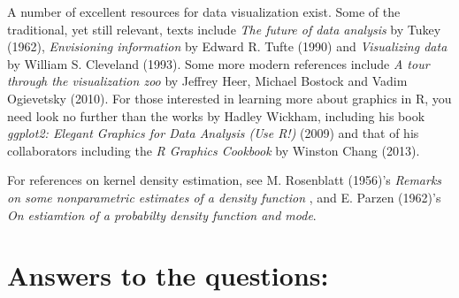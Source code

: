 A number of excellent resources for data visualization exist. Some of the traditional, yet still relevant, texts include \emph{The future of data analysis} by Tukey (1962), \emph{Envisioning information} by Edward R. Tufte (1990) and \emph{Visualizing data} by William S. Cleveland (1993). Some more modern references include \emph{A tour through the visualization zoo} by Jeffrey Heer, Michael Bostock and Vadim Ogievetsky (2010). For those interested in learning more about graphics in R, you need look no further than the works by Hadley Wickham, including his book \emph{ggplot2: Elegant Graphics for Data Analysis (Use R!)} (2009) and that of his collaborators including the \emph{R Graphics Cookbook} by Winston Chang (2013).

For references on kernel density estimation, see M. Rosenblatt (1956)'s \emph{Remarks on some nonparametric estimates of a density function} , and E. Parzen (1962)'s \emph{On estiamtion of a probabilty density function and mode}.





\section{Answers to the questions:}

